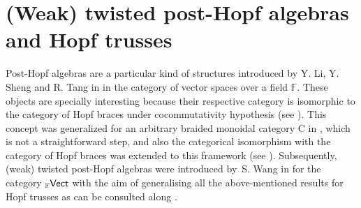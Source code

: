 \documentclass[10pt,a4paper]{amsart}
\numberwithin{equation}{section}
\begin{document}
\section{(Weak) twisted post-Hopf algebras and Hopf trusses}\label{s2}
Post-Hopf algebras are a particular kind of structures introduced by Y. Li, Y. Sheng and R. Tang in \cite{LST} in the category of vector spaces over a field $\mathbb{F}$. These objects are specially interesting because their respective category is isomorphic to the category of Hopf braces under cocommutativity hypothesis (see \cite[Theorem 2.12]{LST}). This concept was generalized for an arbitrary braided monoidal category {\sf C} in \cite{FGR}, which is not a straightforward step, and also the categorical isomorphism with the category of Hopf braces was extended to this framework (see \cite[Theorem~3.16 and Corollary~3.17]{FGR}). Subsequently, (weak) twisted post-Hopf algebras were introduced by~S. Wang in \cite{Wang} for the category ${}_{\mathbb{F}}{\sf Vect}$ with the aim of generalising all the above-mentioned results for Hopf trusses as can be consulted along \cite[Section 6]{Wang}.
\end{document}

